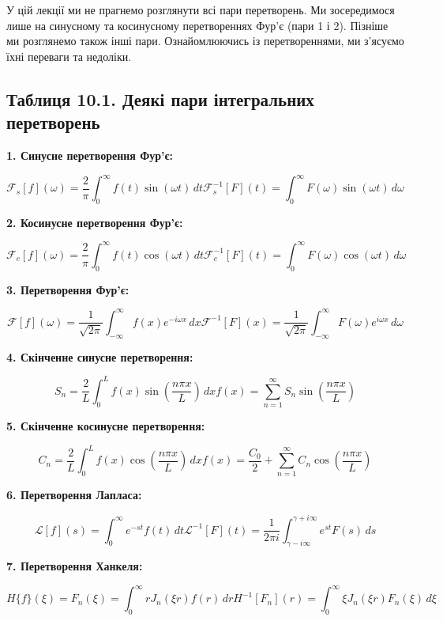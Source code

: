 \documentclass[
  ukrainian,
]{article}
\begin{document}
У цій лекції ми не прагнемо розглянути всі пари перетворень. Ми
зосередимося лише на синусному та косинусному перетвореннях Фур'є (пари
1 і 2). Пізніше ми розглянемо також інші пари. Ознайомлюючись із
перетвореннями, ми з'ясуємо їхні переваги та недоліки.

\subsection{Таблиця 10.1. Деякі пари інтегральних
перетворень}\label{ux442ux430ux431ux43bux438ux446ux44f-10.1.-ux434ux435ux44fux43aux456-ux43fux430ux440ux438-ux456ux43dux442ux435ux433ux440ux430ux43bux44cux43dux438ux445-ux43fux435ux440ux435ux442ux432ux43eux440ux435ux43dux44c}

\textbf{1. Синусне перетворення Фур'є:}

\[
\mathcal{F}_s[f](\omega) = \frac{2}{\pi}\int_0^\infty f(t)\sin(\omega t)\,dt
\mathcal{F}_s^{-1}[F](t) = \int_0^\infty F(\omega)\sin(\omega t)\,d\omega
\]

\textbf{2. Косинусне перетворення Фур'є:}

\[
\mathcal{F}_c[f](\omega) = \frac{2}{\pi}\int_0^\infty f(t)\cos(\omega t)\,dt
\mathcal{F}_c^{-1}[F](t) = \int_0^\infty F(\omega)\cos(\omega t)\,d\omega
\]

\textbf{3. Перетворення Фур'є:}

\[
\mathcal{F}[f](\omega) = \frac{1}{\sqrt{2\pi}}\int_{-\infty}^{\infty} f(x)e^{-i\omega x}\,dx
\mathcal{F}^{-1}[F](x) = \frac{1}{\sqrt{2\pi}}\int_{-\infty}^{\infty} F(\omega)e^{i\omega x}\,d\omega
\]

\textbf{4. Скінченне синусне перетворення:}

\[
S_n = \frac{2}{L}\int_0^L f(x)\sin\left(\frac{n\pi x}{L}\right)\,dx
f(x) = \sum_{n=1}^{\infty} S_n \sin\left(\frac{n\pi x}{L}\right)
\]

\textbf{5. Скінченне косинусне перетворення:}

\[
C_n = \frac{2}{L}\int_0^L f(x)\cos\left(\frac{n\pi x}{L}\right)\,dx
f(x) = \frac{C_0}{2} + \sum_{n=1}^{\infty} C_n \cos\left(\frac{n\pi x}{L}\right)
\]

\textbf{6. Перетворення Лапласа:}

\[
\mathcal{L}[f](s) = \int_0^\infty e^{-st}f(t)\,dt
\mathcal{L}^{-1}[F](t) = \frac{1}{2\pi i}\int_{\gamma-i\infty}^{\gamma+i\infty} e^{st}F(s)\,ds
\]

\textbf{7. Перетворення Ханкеля:}

\[
H\{f\}(\xi) = F_n(\xi) = \int_0^\infty r J_n(\xi r) f(r)\,dr
H^{-1}[F_n](r) = \int_0^\infty \xi J_n(\xi r) F_n(\xi)\,d\xi
\]
\end{document}
